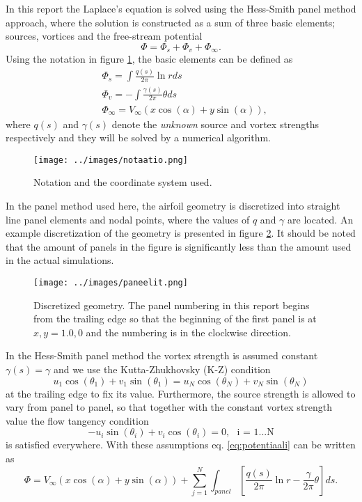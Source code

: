 \documentclass[a4paper,12pt]{article}
\begin{document}
In this report the Laplace's equation is solved using the Hess-Smith panel method approach, where the solution is constructed as a sum of three basic elements; sources, vortices and the free-stream potential
\begin{equation}
\Phi = \Phi_s + \Phi_v + \Phi_\infty.
\label{eq:potentiaali}
\end{equation}
Using the notation in figure \ref{fig:notaatio}, the basic elements can be defined as 
\begin{equation}
\begin{split}
&\Phi_s =  \int \frac{q(s)}{2\pi}\ln r ds\\
&\Phi_v =  -\int \frac{\gamma(s)}{2\pi}\theta ds\\
&\Phi_\infty = V_\infty (x\cos(\alpha) + y\sin(\alpha)),
\end{split}
\end{equation}
where $q(s)$ and $\gamma(s)$ denote the \emph{unknown} source and vortex strengths respectively and they will be solved by a numerical algorithm. 
\begin{figure}[H]
\centering
  \texttt{[image: ../images/notaatio.png]}
\caption{Notation and the coordinate system used. \cite{Moran}}
\label{fig:notaatio}
\end{figure}
In the panel method used here, the airfoil geometry is discretized into straight line panel elements and nodal points, where the values of $q$ and $\gamma$ are located. An example discretization of the geometry is presented in figure \ref{fig:geometry}. It should be noted that the amount of panels in the figure is significantly less than the amount used in the actual simulations.
\begin{figure}[H]
\centering
  \texttt{[image: ../images/paneelit.png]}
\caption{Discretized geometry. The panel numbering in this report begins from the trailing edge so that the beginning of the first panel is at $x,y = 1.0,0$ and the numbering is in the clockwise direction.}
\label{fig:geometry}
\end{figure}

In the Hess-Smith panel method the vortex strength is assumed constant $\gamma(s) = \gamma$ and we use the Kutta-Zhukhovsky (K-Z) condition 
\begin{equation}
u_1 \cos(\theta_1) + v_1 \sin(\theta_1) = u_N \cos(\theta_N) + v_N \sin(\theta_N)
\label{eq:Kutta}
\end{equation}
at the trailing edge to fix its value. Furthermore, the source strength is allowed to vary from panel to panel,  so that together with the constant vortex strength value the flow tangency condition
\begin{equation}
-u_i \sin(\theta_i) + v_i \cos(\theta_i) = 0, \ \ \ \text{i = 1...N}
\label{eq:tangency}
\end{equation}
 is satisfied everywhere.
With these assumptions eq. \ref{eq:potentiaali} can be written as 
\begin{equation}
\Phi = V_\infty (x\cos(\alpha) + y\sin(\alpha)) + \sum_{j=1}^N \int_{panel} \left[\frac{q(s)}{2\pi}\ln r -  \frac{\gamma}{2\pi}\theta \right]ds.
\end{equation}
\end{document}
